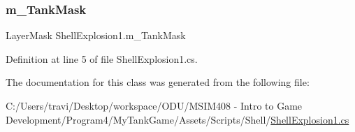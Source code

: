 \mbox{\label{class_shell_explosion1_ad67b4312d1bd3ad312cb1ea5a769d704}} 
\subsubsection{\texorpdfstring{m\+\_\+\+Tank\+Mask}{m\_TankMask}}
{\footnotesize\ttfamily Layer\+Mask Shell\+Explosion1.\+m\+\_\+\+Tank\+Mask}



Definition at line 5 of file Shell\+Explosion1.\+cs.



The documentation for this class was generated from the following file\+:\begin{DoxyCompactItemize}
\item 
C\+:/\+Users/travi/\+Desktop/workspace/\+O\+D\+U/\+M\+S\+I\+M408 -\/ Intro to Game Development/\+Program4/\+My\+Tank\+Game/\+Assets/\+Scripts/\+Shell/\hyperlink{_shell_explosion1_8cs}{Shell\+Explosion1.\+cs}\end{DoxyCompactItemize}
